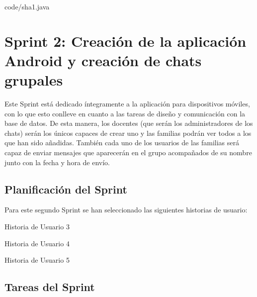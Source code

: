 
						{code/sha1.java}

\clearpage

\section{Sprint 2: Creación de la aplicación Android y creación de chats grupales}
Este Sprint está dedicado íntegramente a la aplicación para dispositivos móviles, con lo que esto conlleve en cuanto a las tareas de diseño y comunicación con la base de datos. De esta manera, los docentes (que serán los administradores de los chats) serán los únicos capaces de crear uno y las familias podrán ver todos a los que han sido añadidas. También cada uno de los usuarios de las familias será capaz de enviar mensajes que aparecerán en el grupo acompañados de su nombre junto con la fecha y hora de envío.

\subsection{Planificación del Sprint}
Para este segundo Sprint se han seleccionado las siguientes historias de usuario:

\begin{table}[!htbp]
	\centering
	{\small
		
	}
	\caption[Historia de Usuario 3]
	{Historia de Usuario 3}
	\label{tab:historia3}
\end{table}

\begin{table}[!htbp]
	\centering
	{\small
		
	}
	\caption[Historia de Usuario 4]
	{Historia de Usuario 4}
	\label{tab:historia4}
\end{table}

\begin{table}[!htbp]
	\centering
	{\small
		
	}
	\caption[Historia de Usuario 5]
	{Historia de Usuario 5}
	\label{tab:historia5}
\end{table}

\newpage

\subsection{Tareas del Sprint}
